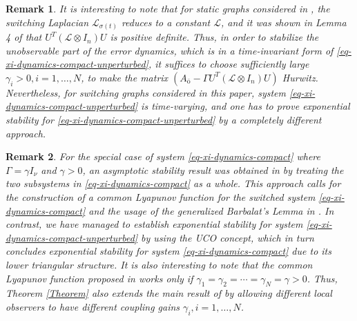 \documentclass[twocolumn]{autart}
\newtheorem{Remark}{Remark}
\begin{document}
\begin{Remark}
 It is interesting to note that for static graphs considered in \cite{KimShim20},
 the switching Laplacian $\mathcal{L}_{\sigma(t)}$ reduces to a constant $\mathcal{L}$,
 and it was shown in Lemma 4 of \cite{KimShim20} that $U^{T}\left(\mathcal{L}\otimes I_{n} \right)U$ is positive definite.
 Thus, in order to stabilize the unobservable part of the error dynamics,
 which is in a time-invariant form of \eqref{eq-xi-dynamics-compact-unperturbed},
 it suffices to choose sufficiently large $\gamma_{i}>0, i=1,\ldots,N$,
 to make the matrix  $\left(A_{\bar{\text{o}}}-\Gamma U^{T}\left(\mathcal{L} \otimes I_{n}\right)U \right)$ Hurwitz.
 Nevertheless, for switching graphs considered in this paper,
 system \eqref{eq-xi-dynamics-compact-unperturbed} is time-varying,
and one has to prove exponential stability for \eqref{eq-xi-dynamics-compact-unperturbed} by a completely different approach.
 \end{Remark}




\begin{Remark}
For the special case of system \eqref{eq-xi-dynamics-compact} where $\Gamma=\gamma I_{\nu}$ and $\gamma>0$,
an asymptotic stability result was obtained in \cite{ZhangLu21ACC} by treating the two subsystems in \eqref{eq-xi-dynamics-compact} as a whole.
This approach calls for the construction of a common Lyapunov function for the switched system \eqref{eq-xi-dynamics-compact} and
the usage of the generalized Barbalat's Lemma in \cite{SuHuang12Full}.
In contrast, we have managed to establish exponential stability for system \eqref{eq-xi-dynamics-compact-unperturbed} by using the UCO concept,
which in turn concludes exponential stability for system  \eqref{eq-xi-dynamics-compact} due to its lower triangular structure.
It is also interesting to note that the common Lyapunov function proposed in \cite{ZhangLu21ACC} works
only if $\gamma_{1}=\gamma_{2}=\cdots=\gamma_{N}=\gamma>0$.
Thus, Theorem \ref{Theorem} also extends the main result of \cite{ZhangLu21ACC}
by allowing different local observers to have different coupling gains $\gamma_{i}, i=1,\ldots,N$.
\end{Remark}
\end{document}
